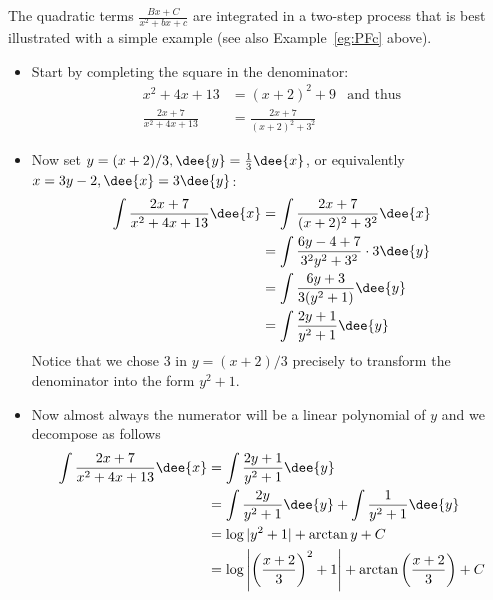The quadratic terms $\frac{Bx+C}{x^2+bx+c}$ are integrated in a two-step process that is
best illustrated with a simple example (see also Example~\ref{eg:PFc} above).
\begin{eg}\label{eg simple quad}
\soln
\begin{itemize}
 \item Start by completing the square in the denominator:
\begin{align*}
  x^2+4x+13 &= (x+2)^2+9 & \text{and thus}\\
  \frac{2x+7}{x^2+4x+13} &= \frac{2x+7}{(x+2)^2+3^2}
\end{align*}
\item Now set $y=(x+2)/3, \dee{y}=\frac{1}{3}\dee{x}$, or equivalently $x=3y-2,
\dee{x}=3\dee{y}$:
\begin{align*}
\int \frac{2x+7}{x^2+4x+13}\dee{x}
&= \int \frac{2x+7}{(x+2)^2+3^2}\dee{x}\\
&= \int \frac{6y-4+7}{3^2 y^2 + 3^2} \cdot 3 \dee{y}\\
&= \int \frac{6y+3}{3(y^2+1)}\dee{y} \\
&= \int \frac{2y+1}{y^2+1}\dee{y}
\end{align*}
Notice that we chose 3 in $y=(x+2)/3$ precisely to transform the
denominator into the form $y^2+1$.

\item Now almost always the numerator will be a linear polynomial of $y$ and we decompose
as follows
\begin{align*}
  \int \frac{2x+7}{x^2+4x+13}\dee{x}
&= \int \frac{2y+1}{y^2+1}\dee{y}\\
&= \int \frac{2y}{y^2+1}\dee{y} + \int \frac{1}{y^2+1}\dee{y}\\
&= \log|y^2+1| + \arctan y + C\\
&= \log\left|\left(\frac{x+2}{3}\right)^2 +1 \right| +
\arctan\left(\frac{x+2}{3} \right)+C
\end{align*}
\end{itemize}

\end{eg}


